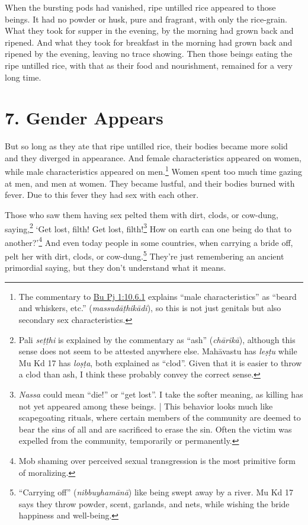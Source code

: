 \documentclass[12pt,openany]{book}%
\begin{document}
When the bursting pods had vanished, ripe untilled rice appeared to those beings. It had no powder or husk, pure and fragrant, with only the rice-grain. What they took for supper in the evening, by the morning had grown back and ripened. And what they took for breakfast in the morning had grown back and ripened by the evening, leaving no trace showing. Then those beings eating the ripe untilled rice, with that as their food and nourishment, remained for a very long time. 

\section*{7. Gender Appears }

But so long as they ate that ripe untilled rice, their bodies became more solid and they diverged in appearance. And female characteristics appeared on women, while male characteristics appeared on men.\footnote{The commentary to \href{https://suttacentral.net/pli-tv-bu-vb-pj1/en/sujato\#10.6.1}{Bu Pj 1:10.6.1} explains “male characteristics” as “beard and whiskers, etc.” (\textit{\textsanskrit{massudāṭhikādi}}), so this is not just genitals but also secondary sex characteristics. } Women spent too much time gazing at men, and men at women. They became lustful, and their bodies burned with fever. Due to this fever they had sex with each other. 

Those who saw them having sex pelted them with dirt, clods, or cow-dung, saying,\footnote{Pali \textit{\textsanskrit{seṭṭhi}} is explained by the commentary as “ash” (\textit{\textsanskrit{chārikā}}), although this sense does not seem to be attested anywhere else. \textsanskrit{Mahāvastu} has \textit{\textsanskrit{leṣṭu}} while Mu Kd 17 has \textit{\textsanskrit{loṣṭa}}, both explained as “clod”. Given that it is easier to throw a clod than ash, I think these probably convey the correct sense. } ‘Get lost, filth! Get lost, filth!\footnote{\textit{Nassa} could mean “die!” or “get lost”. I take the softer meaning, as killing has not yet appeared among these beings. | This behavior looks much like scapegoating rituals, where certain members of the community are deemed to bear the sins of all and are sacrificed to erase the sin. Often the victim was expelled from the community, temporarily or permanently. } How on earth can one being do that to another?’\footnote{Mob shaming over perceived sexual transgression is the most primitive form of moralizing. } And even today people in some countries, when carrying a bride off, pelt her with dirt, clods, or cow-dung.\footnote{“Carrying off” (\textit{\textsanskrit{nibbuyhamānā}}) like being swept away by a river. Mu Kd 17 says they throw powder, scent, garlands, and nets, while wishing the bride happiness and well-being. } They’re just remembering an ancient primordial saying, but they don’t understand what it means. 
\end{document}

